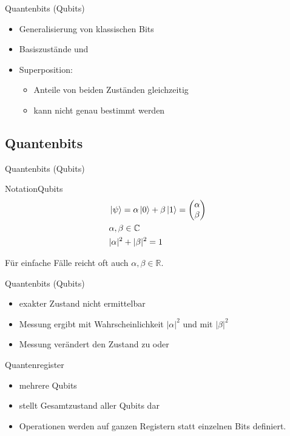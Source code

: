 \documentclass[xcolor=colortbl
,ngerman
]{beamer}
\begin{document}
\begin{frame}{Quantenbits (Qubits)}
    \begin{itemize}
        \item Generalisierung von klassischen Bits
        \item Basiszustände  und 
        \item Superposition: 
            \begin{itemize}
                \item Anteile von beiden Zuständen gleichzeitig
                \item kann nicht genau bestimmt werden
            \end{itemize}
    \end{itemize}
\end{frame}

\subsection{Quantenbits}
\begin{frame}{Quantenbits (Qubits)}
    \begin{block}{Notation}{Qubits}
        \begin{align*}
        &\left|\psi\right\rangle = \alpha \left|0\right\rangle + \beta \left|1\right\rangle = \begin{pmatrix} \alpha \\ \beta \end{pmatrix}  \\
        &\alpha, \beta \in \mathbb C \\
        &|\alpha|^2 + |\beta|^2 = 1
        \end{align*}
    \end{block}
    Für einfache Fälle reicht oft auch $\alpha,\beta \in \mathbb R $.
\end{frame}

\begin{frame}{Quantenbits (Qubits)}
    \begin{itemize}
        \item exakter Zustand nicht ermittelbar
        \item Messung ergibt  mit Wahrscheinlichkeit $|\alpha|^2$ und  mit $|\beta|^2$
        \item Messung verändert den Zustand zu  oder 
    \end{itemize}
\end{frame}

\begin{frame}{Quantenregister}
    \begin{itemize}
        \item mehrere Qubits
        \item stellt Gesamtzustand aller Qubits dar
        \item Operationen werden auf ganzen Registern statt einzelnen Bits definiert.
    \end{itemize}
\end{frame}
\end{document}
